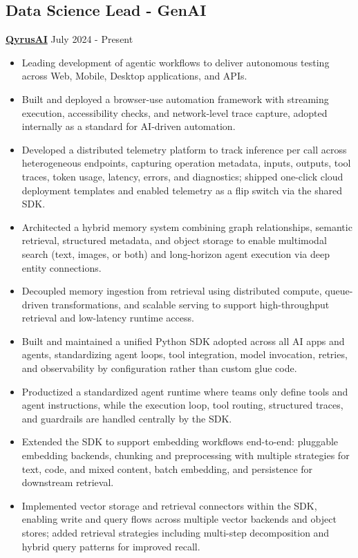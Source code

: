 \documentclass[11pt,a4paper]{article}
\begin{document}
\subsection*{Data Science Lead - GenAI}
\textbf{\href{https://qyrus.ai}{QyrusAI}} \hfill July 2024 - Present\\
\begin{itemize}
    \item Leading development of agentic workflows to deliver autonomous testing across Web, Mobile, Desktop applications, and APIs.
    \item Built and deployed a browser-use automation framework with streaming execution, accessibility checks, and network-level trace capture, adopted internally as a standard for AI-driven automation.
    \item Developed a distributed telemetry platform to track inference per call across heterogeneous endpoints, capturing operation metadata, inputs, outputs, tool traces, token usage, latency, errors, and diagnostics; shipped one-click cloud deployment templates and enabled telemetry as a flip switch via the shared SDK.
    \item Architected a hybrid memory system combining graph relationships, semantic retrieval, structured metadata, and object storage to enable multimodal search (text, images, or both) and long-horizon agent execution via deep entity connections.
    \item Decoupled memory ingestion from retrieval using distributed compute, queue-driven transformations, and scalable serving to support high-throughput retrieval and low-latency runtime access.
    \item Built and maintained a unified Python SDK adopted across all AI apps and agents, standardizing agent loops, tool integration, model invocation, retries, and observability by configuration rather than custom glue code.
    \item Productized a standardized agent runtime where teams only define tools and agent instructions, while the execution loop, tool routing, structured traces, and guardrails are handled centrally by the SDK.
    \item Extended the SDK to support embedding workflows end-to-end: pluggable embedding backends, chunking and preprocessing with multiple strategies for text, code, and mixed content, batch embedding, and persistence for downstream retrieval.
    \item Implemented vector storage and retrieval connectors within the SDK, enabling write and query flows across multiple vector backends and object stores; added retrieval strategies including multi-step decomposition and hybrid query patterns for improved recall.

\end{itemize}
\end{document}
